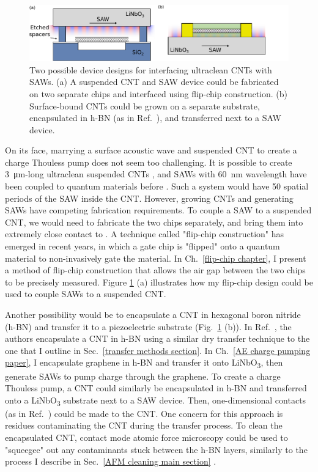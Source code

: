 \documentclass{beavtex_dub_edit}
\begin{document}
\begin{figure}
    \includegraphics[width = 1\textwidth]{Intro thouless pump designs.pdf}
    \caption[Two possible device designs for interfacing ultraclean CNTs with SAWs.]{Two possible device designs for interfacing ultraclean CNTs with SAWs. (a) A suspended CNT and SAW device could be fabricated on two separate chips and interfaced using flip-chip construction. (b) Surface-bound CNTs could be grown on a separate substrate, encapsulated in h-BN (as in Ref.\ \cite{huang_superior_2015}), and transferred next to a SAW device.}
    \label{Thouless pump designs}
\end{figure}

On its face, marrying a surface acoustic wave and suspended CNT to create a charge Thouless pump does not seem too challenging. It is possible to create \SI{3}{\micro\meter}-long ultraclean suspended CNTs \cite{senger_universal_2018}, and SAWs with \SI{60}{\nano\meter} wavelength have been coupled to quantum materials before \cite{kukushkin_collective_2011}. Such a system would have 50 spatial periods of the SAW inside the CNT. However, growing CNTs and generating SAWs have competing fabrication requirements. To couple a SAW to a suspended CNT, we would need to fabricate the two chips separately, and bring them into extremely close contact to . A technique called "flip-chip construction" has emerged in recent years, in which a gate chip is "flipped" onto a quantum material to non-invasively gate the material. In Ch.\ \ref{flip-chip chapter}, I present a method of flip-chip construction that allows the air gap between the two chips to be precisely measured. Figure \ref{Thouless pump designs} (a) illustrates how my flip-chip design could be used to couple SAWs to a suspended CNT.

Another possibility would be to encapsulate a CNT in hexagonal boron nitride (h-BN) and transfer it to a piezoelectric substrate (Fig.\ \ref{Thouless pump designs} (b)). In Ref.\ \cite{huang_superior_2015}, the authors encapsulate a CNT in h-BN using a similar dry transfer technique to the one that I outline in Sec.\ \ref{transfer methods section}. In Ch.\ \ref{AE charge pumping paper}, I encapsulate graphene in h-BN and transfer it onto LiNbO\textsubscript{3}, then generate SAWs to pump charge through the graphene. To create a charge Thouless pump, a CNT could similarly be encapsulated in h-BN and transferred onto a LiNbO\textsubscript{3} substrate next to a SAW device. Then, one-dimensional contacts (as in Ref.\ \cite{huang_superior_2015}) could be made to the CNT. One concern for this approach is residues contaminating the CNT during the transfer process. To clean the encapsulated CNT, contact mode atomic force microscopy could be used to "squeegee" out any contaminants stuck between the h-BN layers, similarly to the process I describe in Sec.\ \ref{AFM cleaning main section} \cite{goossens_mechanical_2012,chen_tip-based_2021}. 
\end{document}
